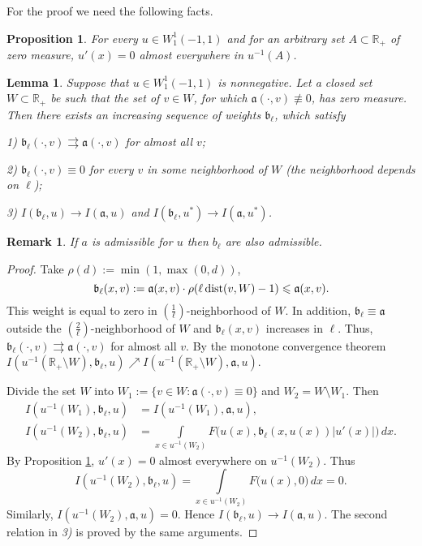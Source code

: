\documentclass[12pt]{article}
\newcommand{\Real}{\mathbb R}
\renewcommand{\le}{\leqslant}
\newtheorem{prop}{Proposition}
\newtheorem{lm}{Lemma}
\newtheorem{rem}{Remark}
\newcommand{\W}{W_1^1}
\newcommand{\dist}{\mathop{\rm dist}\nolimits}
\begin{document}
For the proof we need the following facts.

\begin{prop}
\label{levelDerivative}
{\rm \cite[Theorem 6.19]{LL} }
For every $u \in \W(-1, 1)$ and for an arbitrary set $A \subset \Real_+$ of zero measure,
$u'(x) = 0$ almost everywhere in $u^{-1}(A)$.
\end{prop}

\begin{lm}
\label{zeroApprox}
Suppose that $u \in \W(-1, 1)$ is nonnegative.
Let a closed set $W \subset \Real_+$ be such that
the set of $v \in W$, for which $\mathfrak a(\cdot, v) \not\equiv 0$, has zero measure.
Then there exists an increasing sequence of weights $\mathfrak b_{\ell}$, which satisfy

1) $\mathfrak b_{\ell}(\cdot, v) \rightrightarrows \mathfrak a(\cdot, v)$ for almost all $v$;

2) $\mathfrak b_{\ell}(\cdot, v) \equiv 0$ for every $v$ in some neighborhood of $W$ (the neighborhood depends on $\ell$);

3) $I(\mathfrak b_{\ell}, u) \to I(\mathfrak a, u)$ and $I(\mathfrak b_{\ell}, u^*) \to I(\mathfrak a, u^*)$.
\end{lm}

\begin{rem}
If $a$ is admissible for $u$ then $b_{\ell}$ are also admissible.
\end{rem}

\begin{proof}
Take $\rho(d) := \min(1, \max(0, d))$,
$$\mathfrak b_{\ell}(x, v) := \mathfrak a(x, v) \cdot \rho(\ell \dist(v, W) - 1) \le \mathfrak a(x, v).$$
This weight is equal to zero in $\left(\frac{1}{\ell}\right)$-neighborhood of $W$.
In addition, $\mathfrak b_{\ell} \equiv \mathfrak a$ outside the $\left(\frac{2}{\ell}\right)$-neighborhood of $W$ and
$\mathfrak b_{\ell}(x, v)$ increases in $\ell$.
Thus, $\mathfrak b_{\ell}(\cdot, v) \rightrightarrows \mathfrak a(\cdot, v)$ for almost all $v$.
By the monotone convergence theorem
$I(u^{-1}(\Real_+ \setminus W), \mathfrak b_{\ell}, u) \nearrow I(u^{-1}(\Real_+ \setminus W), \mathfrak a, u)$.

Divide the set $W$ into $W_1 := \{v \in W: \mathfrak a(\cdot, v) \equiv 0\}$ and $W_2 = W \setminus W_1$.
Then
$$
\begin{aligned}
I(u^{-1}(W_1), \mathfrak b_{\ell}, u) &= I(u^{-1}(W_1), \mathfrak a, u),\\
I(u^{-1}(W_2), \mathfrak b_{\ell}, u) &= \int\limits_{x \in u^{-1}(W_2)} F\big(u(x), \mathfrak b_{\ell}(x, u(x)) |u'(x)|\big) \, dx.
\end{aligned}
$$
By Proposition \ref{levelDerivative}, $u'(x) = 0$ almost everywhere on $u^{-1}(W_2)$.
Thus
$$I(u^{-1}(W_2), \mathfrak b_{\ell}, u) = \int\limits_{x \in u^{-1}(W_2)} F\big(u(x), 0\big) \, dx = 0.$$
Similarly, $I(u^{-1}(W_2), \mathfrak a, u) = 0$. Hence $I(\mathfrak b_{\ell}, u) \to I(\mathfrak a, u)$.
The second relation in {\it 3)} is proved by the same arguments.
\end{proof}
\end{document}
